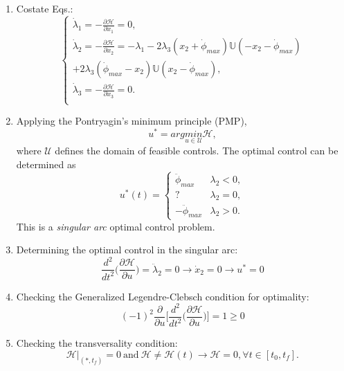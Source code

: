 \documentclass[letterpaper, paper,12pt]{AAS}		%
\begin{document}
\begin{enumerate}
		\item Costate Eqs.:
		\begin{equation}
		\left\{\begin{array}{l}
		\dot{\lambda}_1=-\frac{\partial{\mathscr{H}}}{\partial{x_1}}=0,\\
		\dot{\lambda}_2=-\frac{\partial{\mathscr{H}}}{\partial{x_2}}=-\lambda_1-2\lambda_3(x_2+\dot{\phi}_{max})\mathbb{U}(-x_2-\dot{\phi}_{max})\\
		+2\lambda_3(\dot{\phi}_{max}-x_2)\mathbb{U}(x_2-\dot{\phi}_{max}),\\
		\dot{\lambda}_3=-\frac{\partial{\mathscr{H}}}{\partial{x_3}}=0.\\
		\end{array}
		\right.
		\end{equation}
		\item Applying the Pontryagin's minimum principle (PMP),
		\begin{equation}
		u^*=arg \underset{u\in\mathcal{U}}{min} \mathscr{H},
		\end{equation}
		where $\mathcal{U}$ defines the domain of feasible controls. The optimal control can be determined as
		\begin{equation}
		u^*(t)=\left\{
		\begin{array}{ll}
		\ddot{\phi}_{max}&\lambda_2<0,\\
		?& \lambda_2=0,\\
		-\ddot{\phi}_{max}&\lambda_2>0.
		\end{array}
		\right.
		\end{equation}
		This is a {\it singular arc} optimal control problem.
		
		
		\item Determining the optimal control in the singular arc:
		\begin{equation}
		\frac{d^2}{dt^2}\Big(\frac{\partial \mathscr{H}}{\partial u}\Big)=\ddot{\lambda}_2=0\rightarrow \dot{x}_2=0\rightarrow u^*=0
		\end{equation}
		\item Checking the Generalized Legendre-Clebsch condition for optimality:
		\begin{equation}
		(-1)^2\frac{\partial}{\partial u}\Big[\frac{d^2}{dt^2}\Big(\frac{\partial \mathscr{H}}{\partial u}\Big)\Big]=1\geq 0
		\end{equation}
		\item Checking the transversality condition:
		\begin{equation}
		\mathscr{H}|_{(*,t_f)}=0\  \text{and} \ \mathscr{H}\neq\mathscr{H}(t)\rightarrow \mathscr{H}=0, \forall t\in[t_0, t_f].
		\end{equation}
	\end{enumerate}
	
\end{document}
